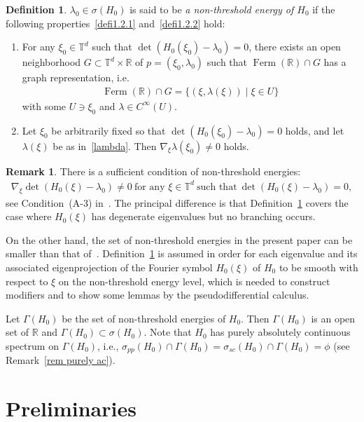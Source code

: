 \documentclass[10pt]{amsart}
\theoremstyle{definition}
\newtheorem{defi}[theo]{Definition}
\newtheorem{rema}[theo]{Remark}
\numberwithin{equation}{section}
\renewcommand{\l}{\lambda}
\newcommand{\x}{\xi}
\newcommand{\s}{\sigma}
\newcommand{\R}{\mathbb{R}}
\newcommand{\T}{\mathbb{T}}
\DeclareMathOperator{\Ferm}{Ferm}
\begin{document}
\begin{defi}\label{nonthr}
$\l_0\in\s(H_0)$ is said to be \emph{a non-threshold energy of $H_0$} if the following properties~\eqref{defi1.2.1} and~\eqref{defi1.2.2} hold:
\begin{enumerate}
\item\label{defi1.2.1} For any $\x_0\in\T^d$ such that $\det(H_0(\x_0)-\l_0)=0$, there exists an open neighborhood $G \subset \T^d \times \R$ of $p=(\x_0,\l_0)$ such that $\Ferm(\R) \cap G$ has a graph representation, i.e.
\begin{align}\label{lambda}
\Ferm(\R) \cap G = \{(\x,\l(\x)) \mid \x\in U \}
\end{align}
with some $U\ni \x_0$ and $\l\in C^\infty(U)$.

\item\label{defi1.2.2} Let $\x_0$ be arbitrarily fixed so that $\det(H_0(\x_0)-\l_0)=0$ holds, and let $\l(\x)$ be as in~\eqref{lambda}. Then $\nabla_\x \l(\x_0) \neq 0$ holds.
\end{enumerate}
\end{defi}

\begin{rema}
There is a sufficient condition of non-threshold energies:
\begin{align*}
\nabla_\x \det(H_0(\x)-\l_0)\neq0 \ \text{for any } \x\in\T^d \ \text{such that} \ \det(H_0(\x)-\l_0)=0,
\end{align*}
see Condition~(A-3) in~\cite[Sections~6~and~7]{An-I-M}. The principal difference is that Definition~\ref{nonthr} covers the case where $H_0(\x)$ has degenerate eigenvalues but no branching occurs.

On the other hand, the set of non-threshold energies in the present paper can be smaller than that of~\cite[Definition~5.5]{P-R}. Definition~\ref{nonthr} is assumed in order for each eigenvalue and its associated eigenprojection of the Fourier symbol $H_0(\x)$ of $H_0$ to be smooth with respect to $\x$ on the non-threshold energy level, which is needed to construct modifiers and to show some lemmas by the pseudodifferential calculus.
\end{rema}

Let $\Gamma(H_0)$ be the set of non-threshold energies of $H_0$. Then $\Gamma(H_0)$ is an open set of $\R$ and $\Gamma(H_0) \subset \s(H_0)$. Note that $H_0$ has purely absolutely continuous spectrum on $\Gamma(H_0)$, i.e., $\s_{pp}(H_0)\cap \Gamma(H_0)=\s_{sc}(H_0)\cap \Gamma(H_0)=\phi$ (see Remark~\ref{rem purely ac}).
\section{Preliminaries}\label{notations sec}
\end{document}
